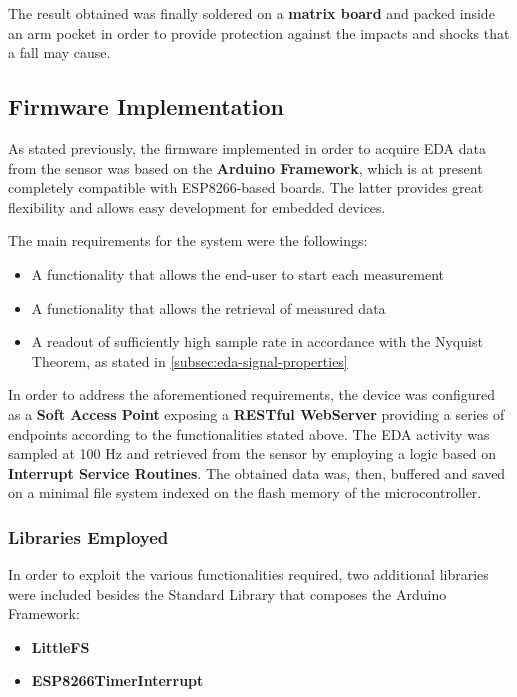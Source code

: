 The result obtained was finally soldered on a \textbf{matrix board} and packed inside an arm pocket in order to provide protection against the impacts and shocks that a fall may cause.  

\subsection{Firmware Implementation}\label{subsec:firmware-implementation}

As stated previously, the firmware implemented in order to acquire EDA data from the sensor was based on the \textbf{Arduino Framework}, which is at present completely compatible with ESP8266-based boards. The latter provides great flexibility and allows easy development for embedded devices. 

The main requirements for the system were the followings:

\begin{itemize}
    \item A functionality that allows the end-user to start each measurement
    \item A functionality that allows the retrieval of measured data
    \item A readout of sufficiently high sample rate in accordance with the Nyquist Theorem, as stated in \ref{subsec:eda-signal-properties}
\end{itemize}

In order to address the aforementioned requirements, the device was configured as a \textbf{Soft Access Point} exposing a \textbf{RESTful WebServer} providing a series of endpoints according to the functionalities stated above. The EDA activity was sampled at 100 Hz and retrieved from the sensor by employing a logic based on \textbf{Interrupt Service Routines}. The obtained data was, then, buffered and saved on a minimal file system indexed on the flash memory of the microcontroller.

\subsubsection{Libraries Employed}\label{subsubsec:libraries-employed}

In order to exploit the various functionalities required, two additional libraries were included besides the Standard Library that composes the Arduino Framework:

\begin{itemize}
    \item \textbf{LittleFS}
    \item \textbf{ESP8266TimerInterrupt}
\end{itemize}

